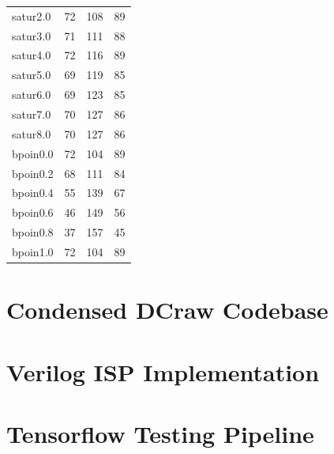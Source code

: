 \documentclass{report}
\begin{document}
\begin{center}
\begin{tabular}{lccc}
		satur2.0 & 72 & 108 & 89\\
		satur3.0 & 71 & 111 & 88\\
		satur4.0 & 72 & 116 & 89\\
		satur5.0 & 69 & 119 & 85\\
		satur6.0 & 69 & 123 & 85\\
		satur7.0 & 70 & 127 & 86\\
		satur8.0 & 70 & 127 & 86\\
		bpoin0.0 & 72 & 104 & 89\\
		bpoin0.2 & 68 & 111 & 84\\
		bpoin0.4 & 55 & 139 & 67\\
		bpoin0.6 & 46 & 149 & 56\\
		bpoin0.8 & 37 & 157 & 45\\
		bpoin1.0 & 72 & 104 & 89\\
	\end{tabular}
\end{center}
	


\section{Condensed DCraw Codebase}

\section{Verilog ISP Implementation}

\section{Tensorflow Testing Pipeline} \label{pipelinecode}
\end{document}
